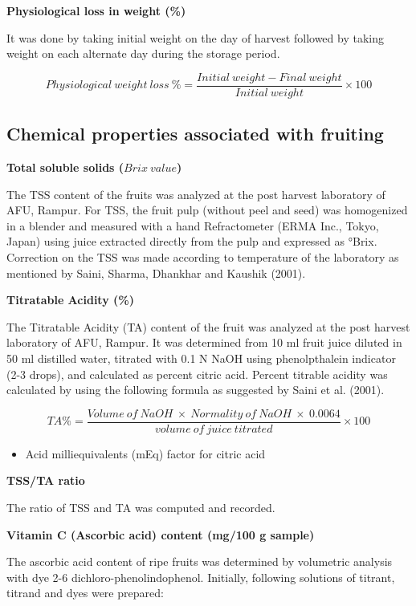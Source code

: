 \documentclass[]{article}
\providecommand{\tightlist}{%
  \setlength{\itemsep}{0pt}\setlength{\parskip}{0pt}}
\begin{document}
\textbf{Physiological loss in weight (\%)}

It was done by taking initial weight on the day of harvest followed by
taking weight on each alternate day during the storage period.

\[Physiological~weight~loss~\% =\frac{Initial~weight-Final~weight}{Initial~weight}\times 100\]

\subsection{Chemical properties associated with
fruiting}\label{chemical-properties-associated-with-fruiting}

\textbf{Total soluble solids (\(Brix~value\))}

The TSS content of the fruits was analyzed at the post harvest
laboratory of AFU, Rampur. For TSS, the fruit pulp (without peel and
seed) was homogenized in a blender and measured with a hand
Refractometer (ERMA Inc., Tokyo, Japan) using juice extracted directly
from the pulp and expressed as °Brix. Correction on the TSS was made
according to temperature of the laboratory as mentioned by Saini,
Sharma, Dhankhar and Kaushik (2001).

\textbf{Titratable Acidity (\%)}

The Titratable Acidity (TA) content of the fruit was analyzed at the
post harvest laboratory of AFU, Rampur. It was determined from 10 ml
fruit juice diluted in 50 ml distilled water, titrated with 0.1 N NaOH
using phenolpthalein indicator (2-3 drops), and calculated as percent
citric acid. Percent titrable acidity was calculated by using the
following formula as suggested by Saini et al. (2001).

\[TA \% = \frac{Volume~of~NaOH~\times~Normality~of~NaOH~\times~0.0064}{volume~of~juice~titrated}\times 100\]

\begin{itemize}
\tightlist
\item
  Acid milliequivalents (mEq) factor for citric acid
\end{itemize}

\textbf{TSS/TA ratio}

The ratio of TSS and TA was computed and recorded.

\textbf{Vitamin C (Ascorbic acid) content (mg/100 g sample)}

The ascorbic acid content of ripe fruits was determined by volumetric
analysis with dye 2-6 dichloro-phenolindophenol. Initially, following
solutions of titrant, titrand and dyes were prepared:
\end{document}
